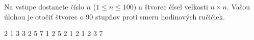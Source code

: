 




Na vstupe dostanete číslo $n$ ($1\leq n \leq 100$) a štvorec čísel veľkosti $n\times n$. Vašou úlohou je
otočiť štvorec o 90 stupňov proti smeru hodinových ručičiek.

2 1 3 
3 2 5 
7 1 2 
 5 2
1 2 1
2 3 7
\koniec


